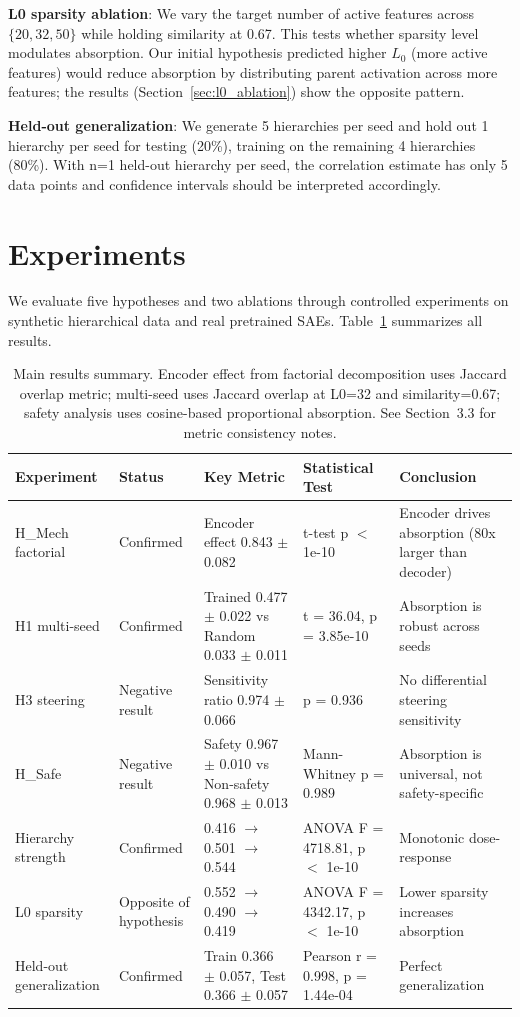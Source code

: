 \documentclass{article}
\begin{document}
\textbf{L0 sparsity ablation}: We vary the target number of active features across $\{20, 32, 50\}$ while holding similarity at 0.67. This tests whether sparsity level modulates absorption. Our initial hypothesis predicted higher $L_0$ (more active features) would reduce absorption by distributing parent activation across more features; the results (Section~\ref{sec:l0_ablation}) show the opposite pattern.

\textbf{Held-out generalization}: We generate 5 hierarchies per seed and hold out 1 hierarchy per seed for testing (20\%), training on the remaining 4 hierarchies (80\%). With n=1 held-out hierarchy per seed, the correlation estimate has only 5 data points and confidence intervals should be interpreted accordingly.

\section{Experiments}

We evaluate five hypotheses and two ablations through controlled experiments on synthetic hierarchical data and real pretrained SAEs. Table~\ref{tab:results_summary} summarizes all results.

\begin{table}[t]
\caption{Main results summary. Encoder effect from factorial decomposition uses Jaccard overlap metric; multi-seed uses Jaccard overlap at L0=32 and similarity=0.67; safety analysis uses cosine-based proportional absorption. See Section~3.3 for metric consistency notes.}
\label{tab:results_summary}
\centering
\begin{tabular}{lllll}
\toprule
Experiment & Status & Key Metric & Statistical Test & Conclusion \\
\midrule
H\_Mech factorial & Confirmed & Encoder effect 0.843 $\pm$ 0.082 & t-test p $<$ 1e-10 & Encoder drives absorption (80x larger than decoder) \\
H1 multi-seed & Confirmed & Trained 0.477 $\pm$ 0.022 vs Random 0.033 $\pm$ 0.011 & t = 36.04, p = 3.85e-10 & Absorption is robust across seeds \\
H3 steering & Negative result & Sensitivity ratio 0.974 $\pm$ 0.066 & p = 0.936 & No differential steering sensitivity \\
H\_Safe & Negative result & Safety 0.967 $\pm$ 0.010 vs Non-safety 0.968 $\pm$ 0.013 & Mann-Whitney p = 0.989 & Absorption is universal, not safety-specific \\
Hierarchy strength & Confirmed & 0.416 $\to$ 0.501 $\to$ 0.544 & ANOVA F = 4718.81, p $<$ 1e-10 & Monotonic dose-response \\
L0 sparsity & Opposite of hypothesis & 0.552 $\to$ 0.490 $\to$ 0.419 & ANOVA F = 4342.17, p $<$ 1e-10 & Lower sparsity increases absorption \\
Held-out generalization & Confirmed & Train 0.366 $\pm$ 0.057, Test 0.366 $\pm$ 0.057 & Pearson r = 0.998, p = 1.44e-04 & Perfect generalization \\
\bottomrule
\end{tabular}
\end{table}
\end{document}
